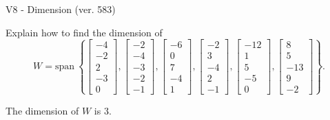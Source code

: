 \begin{exercise}
  \begin{exerciseTitle}V8 - Dimension (ver. 583)\end{exerciseTitle}
  \begin{exerciseStatement}
    Explain how to find the dimension of 
\[W=\mathrm{span}\ \left\{\left[\begin{array}{r}
-4 \\
-2 \\
2 \\
-3 \\
0
\end{array}\right] , \left[\begin{array}{r}
-2 \\
-4 \\
-3 \\
-2 \\
-1
\end{array}\right] , \left[\begin{array}{r}
-6 \\
0 \\
7 \\
-4 \\
1
\end{array}\right] , \left[\begin{array}{r}
-2 \\
3 \\
-4 \\
2 \\
-1
\end{array}\right] , \left[\begin{array}{r}
-12 \\
1 \\
5 \\
-5 \\
0
\end{array}\right] , \left[\begin{array}{r}
8 \\
5 \\
-13 \\
9 \\
-2
\end{array}\right]\right\}.\]



  \end{exerciseStatement}
  \begin{exerciseAnswer}
   The dimension of \(W\) is  \(3\).
  


  \end{exerciseAnswer}
\end{exercise}